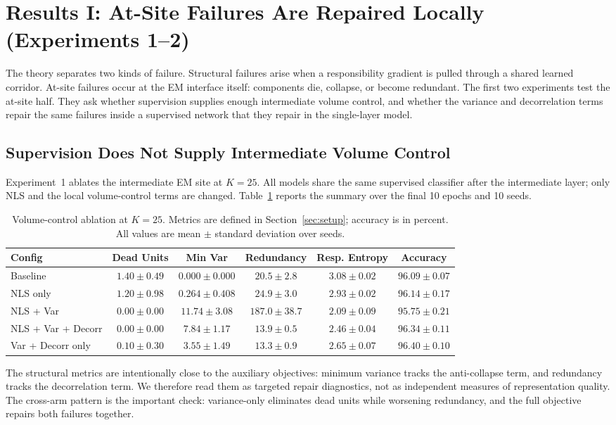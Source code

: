 \section{Results I: At-Site Failures Are Repaired Locally (Experiments 1--2)}
\label{sec:results-volume}
The theory separates two kinds of failure. Structural failures arise when a
responsibility gradient is pulled through a shared learned corridor. At-site
failures occur at the EM interface itself: components die, collapse, or become
redundant. The first two experiments test the at-site half. They ask whether
supervision supplies enough intermediate volume control, and whether the
variance and decorrelation terms repair the same failures inside a supervised
network that they repair in the single-layer model.

\subsection{Supervision Does Not Supply Intermediate Volume Control}
Experiment~1 ablates the intermediate EM site at $K=25$. All models share the
same supervised classifier after the intermediate layer; only NLS and the
local volume-control terms are changed. Table~\ref{tab:volume-ablation}
reports the summary over the final 10 epochs and 10 seeds.
\begin{table}[h]
\centering
\begin{tabular}{lccccc}
\toprule
Config & Dead Units & Min Var & Redundancy & Resp. Entropy & Accuracy \\
\midrule
Baseline &
$1.40\pm0.49$ & $0.000\pm0.000$ & $20.5\pm2.8$ & $3.08\pm0.02$ &
$96.09\pm0.07$ \\
NLS only &
$1.20\pm0.98$ & $0.264\pm0.408$ & $24.9\pm3.0$ & $2.93\pm0.02$ &
$96.14\pm0.17$ \\
NLS + Var &
$0.00\pm0.00$ & $11.74\pm3.08$ & $187.0\pm38.7$ & $2.09\pm0.09$ &
$95.75\pm0.21$ \\
NLS + Var + Decorr &
$0.00\pm0.00$ & $7.84\pm1.17$ & $13.9\pm0.5$ & $2.46\pm0.04$ &
$96.34\pm0.11$ \\
Var + Decorr only &
$0.10\pm0.30$ & $3.55\pm1.49$ & $13.3\pm0.9$ & $2.65\pm0.07$ &
$96.40\pm0.10$ \\
\bottomrule
\end{tabular}
\caption{Volume-control ablation at $K=25$. Metrics are defined in
Section~\ref{sec:setup}; accuracy is in percent. All values are mean $\pm$
standard deviation over seeds.}
\label{tab:volume-ablation}
\end{table}
The structural metrics are intentionally close to the auxiliary objectives:
minimum variance tracks the anti-collapse term, and redundancy tracks the
decorrelation term. We therefore read them as targeted repair diagnostics, not
as independent measures of representation quality. The cross-arm pattern is
the important check: variance-only eliminates dead units while worsening
redundancy, and the full objective repairs both failures together.

